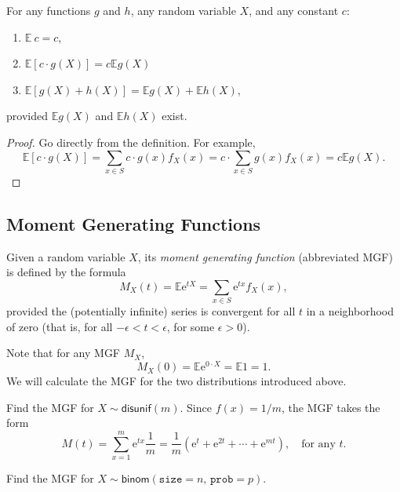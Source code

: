 \documentclass[captions=tableheading]{scrbook}
\begin{document}
\begin{prop}
For any functions \(g\) and \(h\), any random variable \(X\), and any constant \(c\): 
\begin{enumerate}
\item \(\mathbb{E}\: c=c\),
\item \(\mathbb{E}[c\cdot g(X)]=c\mathbb{E} g(X)\)
\item \(\mathbb{E}[g(X)+h(X)]=\mathbb{E} g(X)+\mathbb{E} h(X)\),
\end{enumerate}
provided \(\mathbb{E} g(X)\) and \(\mathbb{E} h(X)\) exist.
\end{prop}

\begin{proof}
Go directly from the definition. For example,
\[
\mathbb{E}[c\cdot g(X)]=\sum_{x\in S}c\cdot g(x)f_{X}(x)=c\cdot\sum_{x\in S}g(x)f_{X}(x)=c\mathbb{E} g(X).
\]
\end{proof}
\subsection{Moment Generating Functions}
\label{sec-5-4-2}
\label{sub-MGFs}


\begin{defn}
Given a random variable \(X\), its \emph{moment generating function} (abbreviated MGF) is defined by the formula
\begin{equation}
M_{X}(t)=\mathbb{E}\mathrm{e}^{tX}=\sum_{x\in S}\mathrm{e}^{tx}f_{X}(x),
\end{equation}
provided the (potentially infinite) series is convergent for all \(t\) in a neighborhood of zero (that is, for all \(-\epsilon<t<\epsilon\), for some \(\epsilon>0\)).
\end{defn}

Note that for any MGF \(M_{X}\),
\begin{equation}
M_{X}(0)=\mathbb{E}\mathrm{e}^{0\cdot X}=\mathbb{E}1=1.
\end{equation}
We will calculate the MGF for the two distributions introduced above.

\begin{example}
Find the MGF for \(X\sim\mathsf{disunif}(m)\). 
Since \(f(x)=1/m\), the MGF takes the form
\[
M(t)=\sum_{x=1}^{m}\mathrm{e}^{tx}\frac{1}{m}=\frac{1}{m}(\mathrm{e}^{t}+\mathrm{e}^{2t}+\cdots+\mathrm{e}^{mt}),\quad \mbox{for any $t$.}
\]

\end{example}

\begin{example}
Find the MGF for \(X\sim\mathsf{binom}(\mathtt{size}=n,\,\mathtt{prob}=p)\).
\end{example}
\end{document}
